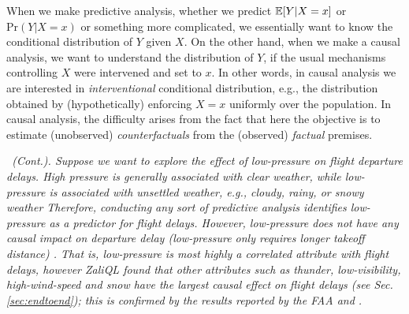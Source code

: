 \begin{example}

\end{example}

When we make predictive analysis, whether we predict $\mathbb{E}[Y | X = x]$ or $\textrm{Pr}(Y | X = x)$ or
something more complicated, we essentially want to know the conditional distribution of $Y$ given $X$.
On the other hand, when we make a causal analysis,
we want to understand the distribution of $Y$,
if the usual mechanisms controlling $X$ were intervened and set to $x$.
In other words, in causal analysis we are interested in {\em  interventional} conditional distribution,
e.g.,  the distribution  obtained by (hypothetically) enforcing $X = x$ uniformly over the population.
In causal analysis, the difficulty arises from the fact that here the objective is to estimate (unobserved)
{\em counterfactuals} from the (observed) {\em factual} premises.


\begin{example} \em \delay \ (Cont.).
\label{ex:press} \em
Suppose we want to explore the effect of low-pressure on flight departure delays.
High pressure is generally associated with clear weather,
while low-pressure is associated with unsettled weather,
e.g., cloudy, rainy, or snowy weather
Therefore, conducting any sort of predictive analysis identifies low-pressure as a predictor for flight delays.
However, low-pressure does not have any causal impact on departure delay
(low-pressure only requires longer takeoff distance) \cite{FAA08}.
That is, low-pressure is most highly a correlated attribute with flight delays,
however ZaliQL found that other attributes such as thunder, low-visibility, high-wind-speed and snow
have the largest causal effect on flight delays (see Sec. \ref{sec:endtoend});
this is confirmed by the results reported by the FAA and \cite{weather}.
\end{example}

